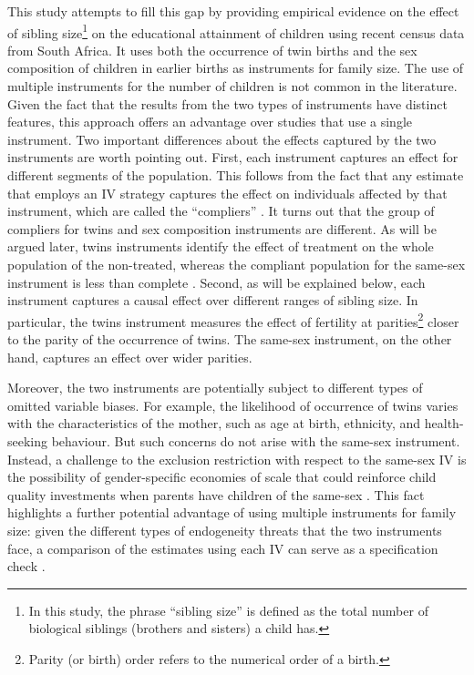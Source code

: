 This study attempts to fill this gap by providing empirical evidence on the effect of sibling size\footnote{In this study, the phrase \enquote{sibling size} is defined as the total number of biological siblings (brothers and sisters) a child has.} on the educational attainment of children using recent census data from South Africa. It uses both the occurrence of twin births and the sex composition of children in earlier births as instruments for family size. The use of multiple instruments for the number of children is not common in the literature. Given the fact that the results from the two types of instruments have distinct features, this approach offers an advantage over studies that use a single instrument. Two important differences about the effects captured by the two instruments are worth pointing out. First, each instrument captures an effect for different segments of the population. This follows from the fact that any estimate that employs an IV strategy captures the effect on individuals affected by that instrument, which are called the \enquote{compliers} \parencite{imbens_identification_1994,angrist_identification_1996}. It turns out that the group of compliers for twins and sex composition instruments are different. As will be argued later, twins instruments identify the effect of treatment on the whole population of the non-treated, whereas the compliant population for the same-sex instrument is less than complete \parencite{Angrist2006,Angrist2009}. Second, as will be explained below, each instrument captures a causal effect over different ranges of sibling size. In particular, the twins instrument measures the effect of fertility at parities\footnote{Parity (or birth) order refers to the numerical order of a birth.} closer to the parity of the occurrence of twins. The same-sex instrument, on the other hand, captures an effect over wider parities. 

Moreover, the two instruments are potentially subject to different types of omitted variable biases. For example, the likelihood of occurrence of twins varies with the characteristics of the mother, such as age at birth, ethnicity, and health-seeking behaviour. But such concerns do not arise with the same-sex instrument. Instead, a challenge to the exclusion restriction with respect to the same-sex IV is the possibility of gender-specific economies of scale that could reinforce child quality investments when parents have children of the same-sex \parencite{rosenzweig_natural_2000}. This fact highlights a further potential advantage of using multiple instruments for family size: given the different types of endogeneity threats that the two instruments face, a comparison of the estimates using each IV can serve as a specification check \parencite{angrist_multiple_2010}.

